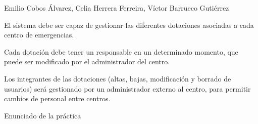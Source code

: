 {Emilio Cobos Álvarez, Celia Herrera Ferreira, Víctor Barrueco Gutiérrez}
{El sistema debe ser capaz de gestionar las diferentes dotaciones asociadas a cada centro de emergencias. \par Cada dotación debe tener un responsable en un determinado momento, que puede ser modificado por el administrador del centro. \par Los integrantes de las dotaciones (altas, bajas, modificación y borrado de usuarios) será gestionado por un administrador externo al centro, para permitir cambios de personal entre centros.}
{}
{Enunciado de la práctica}


